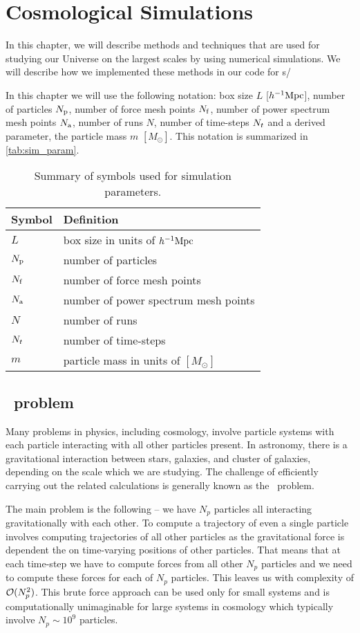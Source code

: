 \chapter{Cosmological Simulations}
\label{chpt:cosmo_sim}
In this chapter, we will describe methods and techniques that are used for studying our Universe on the largest scales by using numerical simulations. We will describe how we implemented these methods in our code for \nbodysim s/

In this chapter we will use the following notation: box size $L$ [$h^{-1}\text{Mpc}$], number of particles $N_{\rm p}$, number of force mesh points $N_{\rm f}$, number of power spectrum mesh points $N_{\rm a}$, number of runs $N$, number of time-steps $N_t$ and a derived parameter, the particle mass $m$ $[M_\odot]$. This notation is summarized in \autoref{tab:sim_param}.

\begin{table}
\begin{tabular}{ll}
    \hline \hline
    Symbol & Definition \\
    \hline
    $L$ & box size in units of $h^{-1}\text{Mpc}$ \\
    $N_{\rm p}$ & number of particles \\
    $N_{\rm f}$ & number of force mesh points \\
    $N_{\rm a}$ & number of power spectrum mesh points \\
    $N$ & number of runs \\
    $N_t$ & number of time-steps \\
    $m$ & particle mass in units of $[M_\odot]$ \\
    \hline \hline
\end{tabular}
\caption{Summary of symbols used for simulation parameters.}
\label{tab:sim_param}
\end{table}


\section{\nbody\ problem}
Many problems in physics, including cosmology, involve particle systems with each particle interacting with all other particles present. In astronomy, there is a gravitational interaction between stars, galaxies, and cluster of galaxies, depending on the scale which we are studying. The challenge of efficiently carrying out the related calculations is generally known as the \nbody\ problem.

The main problem is the following -- we have $N_p$ particles all interacting gravitationally with each other. To compute a trajectory of even a single particle involves computing trajectories of all other particles as the gravitational force is dependent the on time-varying positions of other particles. That means that at each time-step we have to compute forces from all other $N_p$ particles and we need to compute these forces for each of $N_p$ particles. This leaves us with complexity of \(\mathcal{O}(N_p^2)\). This brute force approach can be used only for small systems and is computationally unimaginable for large systems in cosmology which typically involve \(N_p\sim10^{9}\) particles.


